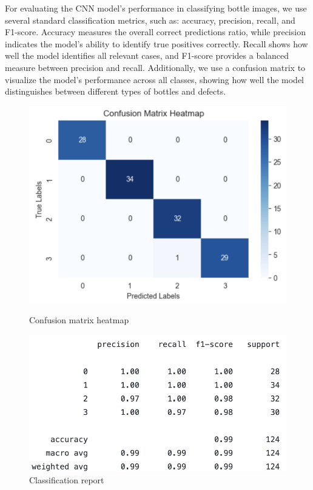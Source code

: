 For evaluating the CNN model's performance in classifying bottle images, we use several standard classification metrics, such as: accuracy, precision, recall, and F1-score.
Accuracy measures the overall correct predictions ratio, while precision indicates the model's ability to identify true positives correctly. 
Recall shows how well the model identifies all relevant cases, and F1-score provides a balanced measure between precision and recall. Additionally, we use a confusion matrix to visualize the model's performance across all classes, showing how well the model distinguishes between different types of bottles and defects.

\begin{figure}[H]
    \centering
    \begin{minipage}{0.48\textwidth}
        \centering
        \includegraphics[scale=0.25]{src/images/heatmap_metric.png}
        \vspace{-0.3cm}
        \caption{Confusion matrix heatmap}
        \label{fig:heatmap}
    \end{minipage}
    \hfill
    \begin{minipage}{0.48\textwidth}
        \centering
        \vspace{0.4cm}
        \includegraphics[scale=0.33]{src/images/cnn_report.png}
        \vspace{0.15cm}
        \caption{Classification report}
        \label{fig:report}
    \end{minipage}
\end{figure}


